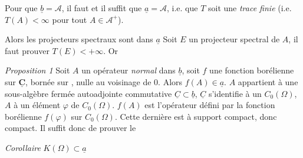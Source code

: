 \documentclass[11pt,a4paper]{article}
\begin{document}
Pour que    $\underline{b} = \mathcal{A}$, il faut et il suffit que $\underline{a} = \mathcal{A}$, i.e. que $T$ soit une \emph{trace finie} (i.e. $T(A) < \infty$ pour tout $A \in \mathcal{A}^{+}$).

 Alors les projecteurs spectraux  sont dans $\underline{a}$  Soit $E$ un projecteur spectral de $A$, il faut prouver $T(E) < +\infty$. Or

\emph{Proposition 1} Soit $A$ un opérateur \emph{normal} dans $\underline{b}$, \struck{\ill{}} soit $f$ une fonction \struck{\ill{}} borélienne sur $\underline{\mathbf{C}}$, bornée sur ,  nulle au voisinage de $0$. Alors $f(A) \in \underline{a}$.   $A$ appartient à une sous-algèbre  fermée autoadjointe commutative $\underline{C} \subset \underline{b}$, $\underline{C}$ s'identifie à un $C_0(\Omega)$, $A$ à un élément $\varphi$ de $C_0(\Omega)$. $f(A)$ est l'opérateur défini par la fonction borélienne $f(\varphi)$ sur $C_0(\Omega)$. Cette dernière  est  à support compact, donc   compact. Il suffit donc de prouver le

\emph{Corollaire}  $K(\Omega) \subset \underline{a}$
\end{document}
